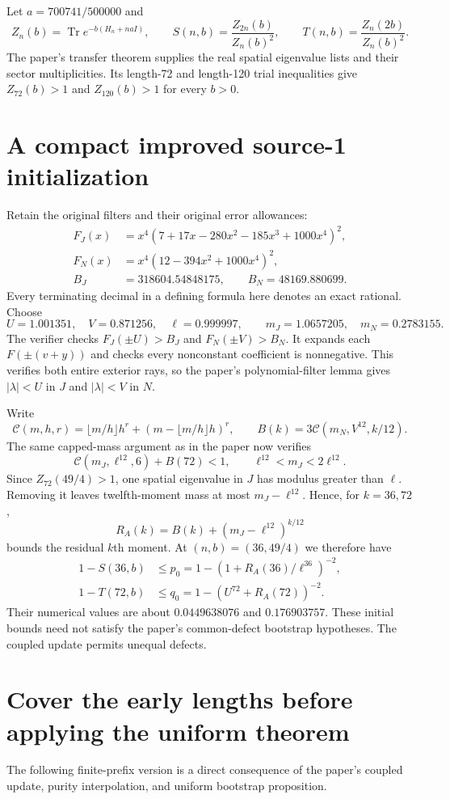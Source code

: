 \documentclass[11pt]{article}
\newcommand{\Tr}{\operatorname{Tr}}
\begin{document}
Let $a=700741/500000$ and
\[
 Z_n(b)=\Tr e^{-b(H_n+naI)},\qquad
 S(n,b)=\frac{Z_{2n}(b)}{Z_n(b)^2},\qquad
 T(n,b)=\frac{Z_n(2b)}{Z_n(b)^2}.
\]
The paper's transfer theorem supplies the real spatial eigenvalue lists and
their sector multiplicities. Its length-72 and length-120 trial inequalities
give $Z_{72}(b)>1$ and $Z_{120}(b)>1$ for every $b>0$.

\section{A compact improved source-1 initialization}
Retain the original filters and their original error allowances:
\begin{align*}
 F_J(x)&=x^4(7+17x-280x^2-185x^3+1000x^4)^2,\\
 F_N(x)&=x^4(12-394x^2+1000x^4)^2,\\
 B_J&=318604.54848175,\qquad B_N=48169.880699.
\end{align*}
Every terminating decimal in a defining formula here denotes an exact
rational. Choose
\[
 U=1.001351,\quad V=0.871256,\quad \ell=0.999997,
 \qquad m_J=1.0657205,\quad m_N=0.2783155.
\]
The verifier checks $F_J(\pm U)>B_J$ and $F_N(\pm V)>B_N$.
It expands each $F(\pm(v+y))$ and checks every nonconstant coefficient is
nonnegative. This verifies both entire exterior rays, so the paper's
polynomial-filter lemma gives $|\lambda|<U$ in $J$ and $|\lambda|<V$ in $N$.

Write
\[
 \mathcal C(m,h,r)=\lfloor m/h\rfloor h^r+
          (m-\lfloor m/h\rfloor h)^r,
 \qquad B(k)=3\mathcal C(m_N,V^{12},k/12).
\]
The same capped-mass argument as in the paper now verifies
\[
 \mathcal C(m_J,\ell^{12},6)+B(72)<1,
 \qquad \ell^{12}<m_J<2\ell^{12}.
\]
Since $Z_{72}(49/4)>1$, one spatial eigenvalue in $J$ has modulus greater
than $\ell$. Removing it leaves twelfth-moment mass at most
$m_J-\ell^{12}$. Hence, for $k=36,72$,
\[
 R_A(k)=B(k)+(m_J-\ell^{12})^{k/12}
\]
bounds the residual $k$th moment. At $(n,b)=(36,49/4)$ we therefore have
\begin{align*}
 1-S(36,b)&\le p_0=1-(1+R_A(36)/\ell^{36})^{-2},\\
 1-T(72,b)&\le q_0=1-(U^{72}+R_A(72))^{-2}.
\end{align*}
Their numerical values are about $0.0449638076$ and $0.176903757$.
These initial bounds need not satisfy the paper's common-defect bootstrap
hypotheses. The coupled update permits unequal defects.

\section{Cover the early lengths before applying the uniform theorem}
The following finite-prefix version is a direct consequence of the paper's
coupled update, purity interpolation, and uniform bootstrap proposition.
\end{document}

